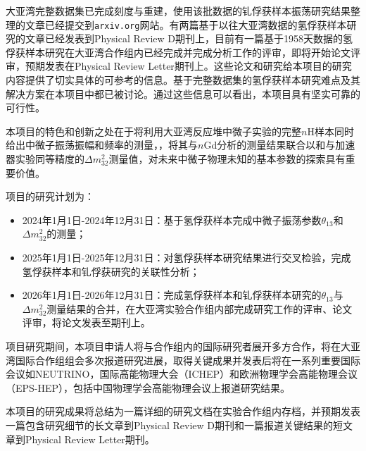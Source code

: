 \documentclass[a4paper,zihao=-4]{article}
\begin{document}
大亚湾完整数据集已完成刻度与重建，使用该批数据的钆俘获样本振荡研究结果整理的文章已经提交到\texttt{arxiv.org}网站。有两篇基于以往大亚湾数据的氢俘获样本研究的文章已经发表到Physical Review D期刊上，目前有一篇基于1958天数据的氢俘获样本研究在大亚湾合作组内已经完成并完成分析工作的评审，即将开始论文评审，预期发表在Physical Review Letter期刊上。这些论文和研究给本项目的研究内容提供了切实具体的可参考的信息。基于完整数据集的氢俘获样本研究难点及其解决方案在本项目中都已被讨论。通过这些信息可以看出，本项目具有坚实可靠的可行性。


本项目的特色和创新之处在于将利用大亚湾反应堆中微子实验的完整$n$H样本同时给出中微子振荡振幅和频率的测量，，将其与$n$Gd分析的测量结果联合以和与加速器实验同等精度的$\Delta m_{32}^2$测量值，对未来中微子物理未知的基本参数的探索具有重要价值。


项目的研究计划为：
\begin{itemize}
	\item 2024年1月1日-2024年12月31日：基于氢俘获样本完成中微子振荡参数$\theta_{13}$和$\Delta m_{32}^2$的测量；
	\item 2025年1月1日-2025年12月31日：对氢俘获样本研究结果进行交叉检验，完成氢俘获样本和钆俘获研究的关联性分析；
	\item 2026年1月1日-2026年12月31日：完成氢俘获样本和钆俘获样本研究的$\theta_{13}$与$\Delta m_{32}^2$测量结果的合并，在大亚湾实验合作组内部完成研究工作的评审、论文评审，将论文发表至期刊上。
\end{itemize}

项目研究期间，本项目申请人将与合作组内的国际研究者展开多方合作，将在大亚湾国际合作组组会多次报道研究进展，取得关键成果并发表后将在一系列重要国际会议如NEUTRINO，国际高能物理大会（ICHEP）和欧洲物理学会高能物理会议（EPS-HEP），包括中国物理学会高能物理会议上报道研究结果。

本项目的研究成果将总结为一篇详细的研究文档在实验合作组内存档，并预期发表一篇包含研究细节的长文章到Physical Review D期刊和一篇报道关键结果的短文章到Physical Review Letter期刊。
\end{document}
